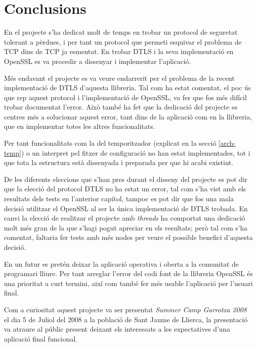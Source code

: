 \chapter{Conclusions}
En el projecte s'ha dedicat molt de temps en trobar un protocol de seguretat tolerant a pèrdues, i per tant un protocol que permeti esquivar el problema de TCP dins de TCP ja esmentat. En trobar DTLS i la seva implementació en OpenSSL es va procedir a dissenyar i implementar l'aplicació.

Més endavant el projecte es va veure endarrerit per el problema de la recent implementació de DTLS d'aquesta llibreria.
Tal com ha estat comentat, el poc ús que rep aquest protocol i l'implementació de OpenSSL, va fer que fos més difícil trobar documentat l'error. Això també ha fet que la dedicació del projecte es centres més a solucionar aquest error, tant dins de la aplicació com en la llibreria, que en implementar totes les altres funcionalitats.

Per tant funcionalitats com la del temporitzador (explicat en la secció \ref{arch-temp}) o un interpret pel fitxer de configuració no han estat implementades, tot i que tota la estructura està dissenyada i preparada per que hi acabi existint.

De les diferents eleccions que s'han pres durant el disseny del projecte es pot dir que la elecció del protocol DTLS no ha estat un error, tal com s'ha vist amb els resultats dels tests en l'anterior capítol, tampoc es pot dir que fos una mala decisió utilitzar el OpenSSL al ser la única implementació de DTLS trobada. En canvi la elecció de realitzar el projecte amb \emph{threads} ha comportat una dedicació molt més gran de la que s'hagi pogut apreciar en els resultats; però tal com s'ha comentat, faltaria fer tests amb més nodes per veure el possible benefici d'aquesta decisió.

En un futur es pretén deixar la aplicació operativa i oberta a la comunitat de programari lliure.
Per tant arreglar l'error del codi font de la llibreria OpenSSL és una prioritat a curt termini, així com també fer més usable l'aplicació per l'usuari final.

Com a curiositat aquest projecte va ser presentat \emph{Summer Camp Garrotxa 2008} el dia 5 de Juliol del 2008 a la població de Sant Jaume de Llierca, la presentació va atraure al públic present deixant els interessats a les expectatives d'una aplicació final funcional.
